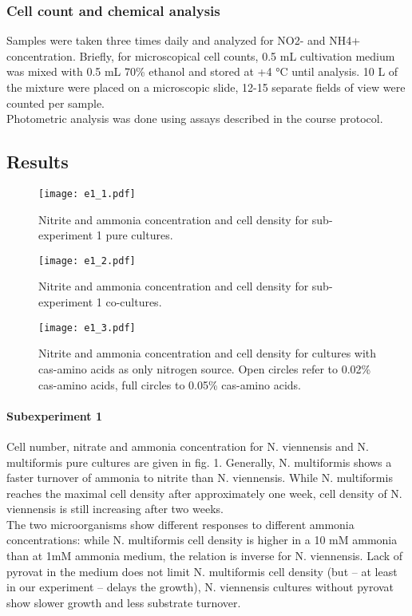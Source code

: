 \documentclass[a4paper,10pt]{article}
\begin{document}
\subsubsection{Cell count and chemical analysis}
Samples were taken three times daily and analyzed for NO2- and NH4+ concentration. Briefly, for microscopical cell counts, 0.5 mL cultivation medium was mixed with 0.5 mL 70\% ethanol and stored at +4 °C until analysis. 10 \textmu L of the mixture were placed on a microscopic slide, 12-15 separate fields of view were counted per sample. 
\\Photometric analysis was done using assays described in the course protocol.

\subsection{Results}

\begin{figure}[h!]
\begin{center}
\texttt{[image: e1\_1.pdf]}
\caption{Nitrite and ammonia concentration and cell density for sub-experiment 1 pure cultures.}
\end{center}
\end{figure}

\begin{figure}[h!]
\begin{center}
\texttt{[image: e1\_2.pdf]}
\caption{Nitrite and ammonia concentration and cell density for sub-experiment 1 co-cultures.}
\end{center}
\end{figure}


\begin{figure}[h!]
\begin{center}
\texttt{[image: e1\_3.pdf]}
\caption{Nitrite and ammonia concentration and cell density for cultures with cas-amino acids as only nitrogen source. Open circles refer to 0.02\% cas-amino acids, full circles to 0.05\% cas-amino acids.}
\end{center}
\end{figure}


\paragraph{Subexperiment 1}
Cell number, nitrate and ammonia concentration for N. viennensis and N. multiformis pure cultures are given in fig. 1. Generally, N. multiformis shows a faster turnover of ammonia to nitrite than N. viennensis. While N. multiformis reaches the maximal cell density after approximately one week, cell density of N. viennensis is still increasing after two weeks. 
\\The two microorganisms show different responses to different ammonia concentrations: while N. multiformis cell density is higher in a 10 mM ammonia than at 1mM ammonia medium, the relation is inverse for N. viennensis. Lack of pyrovat in the medium does not limit N. multiformis cell density (but – at least in our experiment – delays the growth), N. viennensis cultures without pyrovat show slower growth and less substrate turnover.
\end{document}
